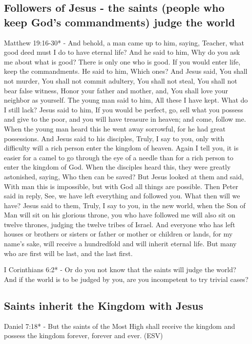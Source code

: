 \documentclass[11pt]{article}
\begin{document}
\subsection{Followers of Jesus - the saints (people who keep God's commandments) judge the world}
\label{sec:org1c7b018}
Matthew 19:16-30* - And behold, a man came up to him, saying, Teacher, what good deed must I do to have eternal life?  And he said to him, Why do you ask me about what is good? There is only one who is good. If you would enter life, keep the commandments.  He said to him, Which ones? And Jesus said, You shall not murder, You shall not commit adultery, You shall not steal, You shall not bear false witness, Honor your father and mother, and, You shall love your neighbor as yourself.  The young man said to him, All these I have kept. What do I still lack?  Jesus said to him, If you would be perfect, go, sell what you possess and give to the poor, and you will have treasure in heaven; and come, follow me.  When the young man heard this he went away sorrowful, for he had great possessions.  And Jesus said to his disciples, Truly, I say to you, only with difficulty will a rich person enter the kingdom of heaven.  Again I tell you, it is easier for a camel to go through the eye of a needle than for a rich person to enter the kingdom of God.  When the disciples heard this, they were greatly astonished, saying, Who then can be saved?  But Jesus looked at them and said, With man this is impossible, but with God all things are possible.  Then Peter said in reply, See, we have left everything and followed you. What then will we have?  Jesus said to them, Truly, I say to you, in the new world, when the Son of Man will sit on his glorious throne, you who have followed me will also sit on twelve thrones, judging the twelve tribes of Israel.  And everyone who has left houses or brothers or sisters or father or mother or children or lands, for my name's sake, will receive a hundredfold and will inherit eternal life.  But many who are first will be last, and the last first.

I Corinthians 6:2* - Or do you not know that the saints will judge the world? And if the world is to be judged by you, are you incompetent to try trivial cases?

\subsection{Saints inherit the Kingdom with Jesus}
\label{sec:orgbc431ac}
Daniel 7:18* -  But the saints of the Most High shall receive the kingdom and possess the kingdom forever, forever and ever.  (ESV)
\end{document}

